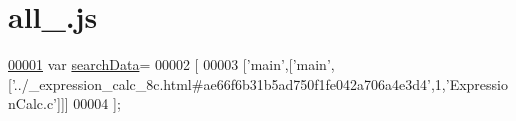 \hypertarget{all__3_8js_source}{\section{all\+\_.\+js}
\label{all__3_8js_source}
}

\begin{DoxyCode}
\hypertarget{all__3_8js_source_l00001}{}\hyperlink{all__3_8js_ad01a7523f103d6242ef9b0451861231e}{00001} var \hyperlink{all__3_8js_ad01a7523f103d6242ef9b0451861231e}{searchData}=
00002 [
00003   [\textcolor{stringliteral}{'main'},[\textcolor{stringliteral}{'main'},[\textcolor{stringliteral}{'../\_expression\_calc\_8c.html#ae66f6b31b5ad750f1fe042a706a4e3d4'},1,\textcolor{stringliteral}{'ExpressionCalc.c'}]]]
00004 ];
\end{DoxyCode}
